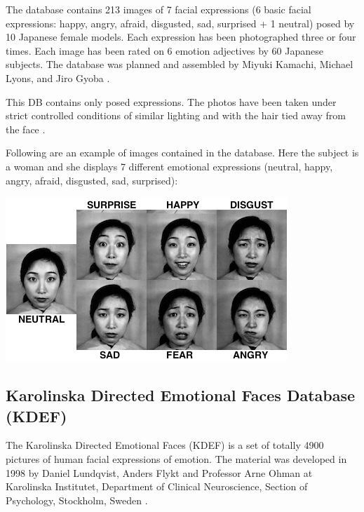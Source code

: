 \vspace{\baselineskip}
\noindent The database contains 213 images of 7 facial expressions (6 basic facial expressions: happy, angry, afraid, disgusted, sad, surprised + 1 neutral) posed by 10 Japanese female models. Each expression has been photographed three or four times. Each image has been rated on 6 emotion adjectives by 60 Japanese subjects. The database was planned and assembled by Miyuki Kamachi, Michael Lyons, and Jiro Gyoba \cite{JAFFE}.
\newline

\noindent This DB contains only posed expressions. The photos have been taken under strict controlled conditions of similar lighting and with the hair tied away from the face \cite{PAN00}. 
\newline

\noindent Following are an example of images contained in the database. Here the subject is a woman and she displays 7 different emotional expressions (neutral, happy, angry, afraid, disgusted, sad, surprised): 
\newline

\vspace{\baselineskip}
\begin{center}
\noindent \includegraphics[scale=0.8]{figures/jaffe_7facialexpressions} 
\newline
\end{center} 

\subsection{Karolinska Directed Emotional Faces Database (KDEF)}

\vspace{\baselineskip}
\noindent The Karolinska Directed Emotional Faces (KDEF) is a set of totally 4900 pictures of human facial expressions of emotion. The material was developed in 1998 by Daniel Lundqvist, Anders Flykt and Professor Arne Ohman at Karolinska Institutet, Department of Clinical Neuroscience, Section of Psychology, Stockholm, Sweden \cite{KDEF}.
\newline

